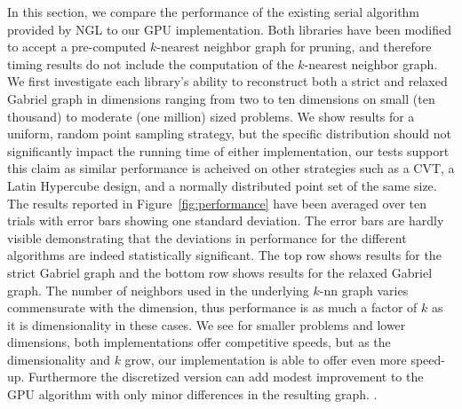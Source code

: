 In this section, we compare the performance of the existing serial algorithm provided by NGL to our GPU implementation.
%
Both libraries have been modified to accept a pre-computed $k$-nearest neighbor graph for pruning, and therefore timing results do not include the computation of the $k$-nearest neighbor graph.
%
We first investigate each library's ability to reconstruct both a strict and relaxed Gabriel graph in dimensions ranging from two to ten dimensions on small (ten thousand) to moderate (one million) sized problems.
%
We show results for a uniform, random point sampling strategy, but the specific distribution should not significantly impact the running time of either implementation, our tests support this claim as similar performance is acheived on other strategies such as a CVT, a Latin Hypercube design, and a normally distributed point set of the same size.
%
The results reported in Figure~\ref{fig:performance} have been averaged over ten trials with error bars showing one standard deviation.
%
The error bars are hardly visible demonstrating that the deviations in performance for the different algorithms are indeed statistically significant.
%
The top row shows results for the strict Gabriel graph and the bottom row shows results for the relaxed Gabriel graph.
%
The number of neighbors used in the underlying $k$-nn graph varies commensurate with the dimension, thus performance is as much a factor of $k$ as it is dimensionality in these cases.
%
We see for smaller problems and lower dimensions, both implementations offer competitive speeds, but as the dimensionality and $k$ grow, our implementation is able to offer even more speed-up.
%
Furthermore the discretized version can add modest improvement to the GPU algorithm with only minor differences in the resulting graph.
%
.

